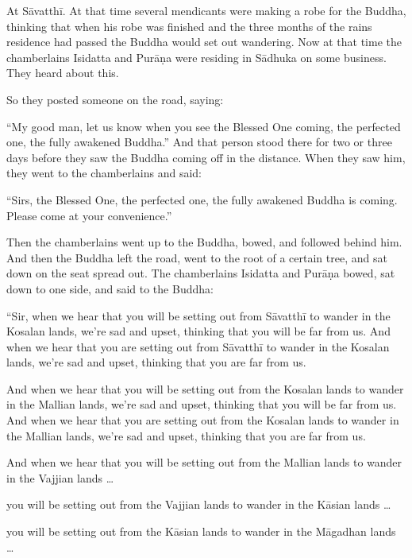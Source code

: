 \documentclass[12pt,openany]{book}%
\begin{document}
At \textsanskrit{Sāvatthī}. At that time several mendicants were making a robe for the Buddha, thinking that when his robe was finished and the three months of the rains residence had passed the Buddha would set out wandering. Now at that time the chamberlains Isidatta and \textsanskrit{Purāṇa} were residing in \textsanskrit{Sādhuka} on some business. They heard about this. 

So they posted someone on the road, saying: 

“My good man, let us know when you see the Blessed One coming, the perfected one, the fully awakened Buddha.” And that person stood there for two or three days before they saw the Buddha coming off in the distance. When they saw him, they went to the chamberlains and said: 

“Sirs, the Blessed One, the perfected one, the fully awakened Buddha is coming. Please come at your convenience.” 

Then the chamberlains went up to the Buddha, bowed, and followed behind him. And then the Buddha left the road, went to the root of a certain tree, and sat down on the seat spread out. The chamberlains Isidatta and \textsanskrit{Purāṇa} bowed, sat down to one side, and said to the Buddha: 

“Sir, when we hear that you will be setting out from \textsanskrit{Sāvatthī} to wander in the Kosalan lands, we’re sad and upset, thinking that you will be far from us. And when we hear that you are setting out from \textsanskrit{Sāvatthī} to wander in the Kosalan lands, we’re sad and upset, thinking that you are far from us. 

And when we hear that you will be setting out from the Kosalan lands to wander in the Mallian lands, we’re sad and upset, thinking that you will be far from us. And when we hear that you are setting out from the Kosalan lands to wander in the Mallian lands, we’re sad and upset, thinking that you are far from us. 

And when we hear that you will be setting out from the Mallian lands to wander in the Vajjian lands … 

you will be setting out from the Vajjian lands to wander in the \textsanskrit{Kāsian} lands … 

you will be setting out from the \textsanskrit{Kāsian} lands to wander in the \textsanskrit{Māgadhan} lands … 
\end{document}
